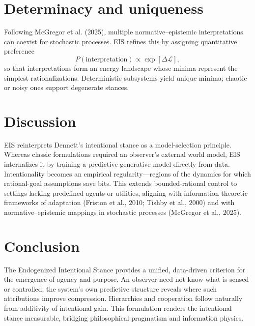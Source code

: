 \documentclass[11pt]{article}
\begin{document}
\section{Determinacy and uniqueness}

Following McGregor et al. (2025),
multiple normative–epistemic interpretations can coexist for stochastic processes.
EIS refines this by assigning quantitative preference
\[
P(\text{interpretation})\propto
\exp[\Delta\mathcal L],
\]
so that interpretations form an energy landscape whose minima represent the simplest rationalizations.
Deterministic subsystems yield unique minima;
chaotic or noisy ones support degenerate stances.

\section{Discussion}

EIS reinterprets Dennett’s intentional stance as a model-selection principle.
Whereas classic formulations required an observer’s external world model,
EIS internalizes it by training a predictive generative model directly from data.
Intentionality becomes an empirical regularity—regions of the dynamics for which
rational-goal assumptions save bits.
This extends bounded-rational control to settings lacking predefined agents or utilities,
aligning with information-theoretic frameworks of adaptation
(Friston et al., 2010; Tishby et al., 2000)
and with normative–epistemic mappings in stochastic processes
(McGregor et al., 2025).

\section{Conclusion}

The Endogenized Intentional Stance provides a unified,
data-driven criterion for the emergence of agency and purpose.
An observer need not know what is sensed or controlled;
the system’s own predictive structure reveals where such attributions
improve compression.
Hierarchies and cooperation follow naturally from
additivity of intentional gain.
This formulation renders the intentional stance measurable,
bridging philosophical pragmatism and information physics.
\end{document}
